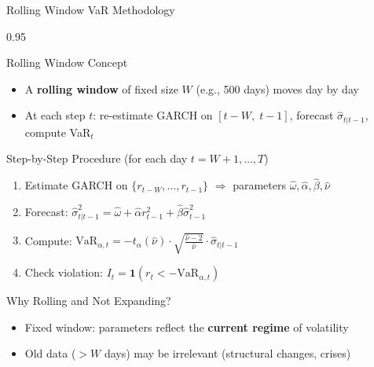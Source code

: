 \documentclass[9pt, aspectratio=169, t]{beamer}
\begin{document}
\begin{frame}{Rolling Window VaR Methodology}
    \begin{cminipage}{0.95\textwidth}
    \vspace{-0.2cm}
    {\small
    \begin{block}{Rolling Window Concept}
        \begin{itemize}\setlength{\itemsep}{0pt}
            \item A \textbf{rolling window} of fixed size $W$ (e.g., 500 days) moves day by day
            \item At each step $t$: re-estimate GARCH on $[t-W,\; t-1]$, forecast $\hat{\sigma}_{t|t-1}$, compute VaR$_t$
        \end{itemize}
    \end{block}
    \vspace{-0.2cm}
    \begin{exampleblock}{Step-by-Step Procedure (for each day $t = W+1, \ldots, T$)}
        \begin{enumerate}\setlength{\itemsep}{0pt}
            \item Estimate GARCH on $\{r_{t-W}, \ldots, r_{t-1}\}$ $\Rightarrow$ parameters $\hat{\omega}, \hat{\alpha}, \hat{\beta}, \hat{\nu}$
            \item Forecast: $\hat{\sigma}_{t|t-1}^2 = \hat{\omega} + \hat{\alpha} r_{t-1}^2 + \hat{\beta} \hat{\sigma}_{t-1}^2$
            \item Compute: $\text{VaR}_{\alpha,t} = -t_{\alpha}(\hat{\nu}) \cdot \sqrt{\frac{\hat{\nu}-2}{\hat{\nu}}} \cdot \hat{\sigma}_{t|t-1}$
            \item Check violation: $I_t = \mathbf{1}(r_t < -\text{VaR}_{\alpha,t})$
        \end{enumerate}
    \end{exampleblock}
    \vspace{-0.2cm}
    \begin{alertblock}{Why Rolling and Not Expanding?}
        \begin{itemize}\setlength{\itemsep}{0pt}
            \item Fixed window: parameters reflect the \textbf{current regime} of volatility
            \item Old data ($> W$ days) may be irrelevant (structural changes, crises)
        \end{itemize}
    \end{alertblock}
    }
    \end{cminipage}
\end{frame}
\end{document}
